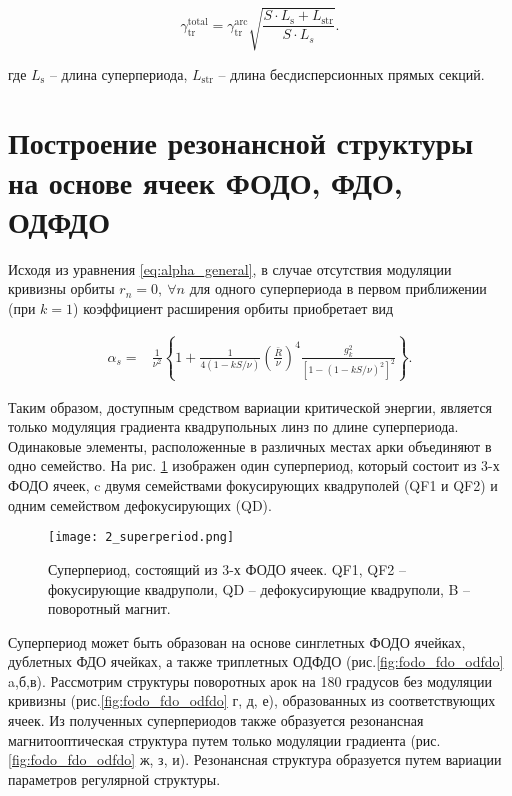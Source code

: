 \begin{equation}
\gamma_{\text{tr}}^{\text{total}}=\gamma_{\text{tr}}^{\text{arc}}\sqrt{\frac{S\cdot L_{\text{s}}+L_{\text{str}}}{S\cdot L_s}}.
\label {eq:gamma_tr_modulated}
\end{equation}

\noindent где $L_{\text{s}}$ -- длина суперпериода, $L_{\text{str}}$ -- длина бесдисперсионных прямых секций.

	\section{Построение резонансной структуры на основе ячеек ФОДО, ФДО, ОДФДО}\label{sec:transition_variation/methods/FODO_FDO}

Исходя из уравнения \ref{eq:alpha_general}, в случае отсутствия модуляции кривизны орбиты $r_n=0, \ \forall n$ для одного суперпериода в первом приближении (при $k=1$) коэффициент расширения орбиты приобретает вид
	
\begin{equation}
\begin{aligned}
\alpha_s= & \frac{1}{\nu^2}\left\{1+\frac{1}{4(1-k S / \nu)}\left(\frac{\bar{R}}{\nu}\right)^4 \frac{g_k^2}{\left[1-(1-k S / \nu)^2\right]^2}\right\}.
\end{aligned}
\label{eq:alpha_gradient}
\end{equation}

\noindent Таким образом, доступным средством вариации критической энергии, является только модуляция градиента квадрупольных линз по длине суперпериода. Одинаковые элементы, расположенные в различных местах арки объединяют в одно семейство. На рис. \ref{fig:superperiod_3FODO} изображен один суперпериод, который состоит из 3-х ФОДО ячеек, c двумя семействами фокусирующих квадруполей (QF1 и QF2) и одним семейством дефокусирующих (QD).

\begin{figure} [h!]
   \texttt{[image: 2\_superperiod.png]}
   \caption{Суперпериод, состоящий из 3-х ФОДО ячеек. QF1, QF2 -- фокусирующие квадруполи, QD -- дефокусирующие квадруполи, B -- поворотный магнит.}
   \label{fig:superperiod_3FODO}
\end{figure}
	
\par Суперпериод может быть образован на основе синглетных ФОДО ячейках, дублетных ФДО ячейках, а также триплетных ОДФДО (рис.\ref{fig:fodo_fdo_odfdo} a,б,в). Рассмотрим структуры поворотных арок на 180 градусов без модуляции кривизны (рис.\ref{fig:fodo_fdo_odfdo} г, д, е), образованных из соответствующих ячеек. Из полученных суперпериодов также образуется резонансная магнитооптическая структура путем только модуляции градиента (рис.\ref{fig:fodo_fdo_odfdo} ж, з, и). Резонансная структура образуется путем вариации параметров регулярной структуры.

